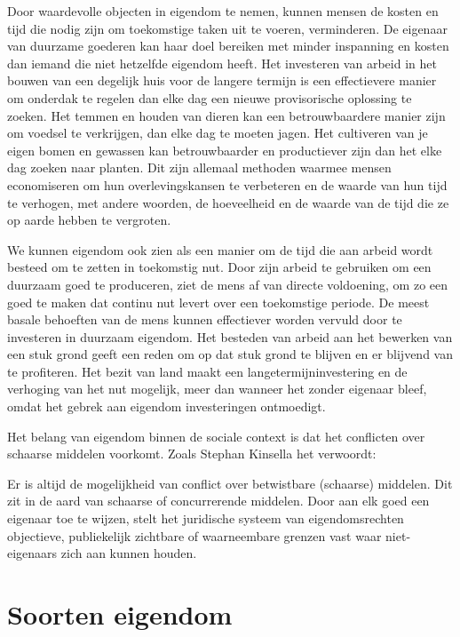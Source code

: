 Door waardevolle objecten in eigendom te nemen, kunnen mensen de kosten en tijd die nodig zijn om toekomstige taken uit te voeren, verminderen. De eigenaar van duurzame goederen kan haar doel bereiken met minder inspanning en kosten dan iemand die niet hetzelfde eigendom heeft. Het investeren van arbeid in het bouwen van een degelijk huis voor de langere termijn is een effectievere manier om onderdak te regelen dan elke dag een nieuwe provisorische oplossing te zoeken. Het temmen en houden van dieren kan een betrouwbaardere manier zijn om voedsel te verkrijgen, dan elke dag te moeten jagen. Het cultiveren van je eigen bomen en gewassen kan betrouwbaarder en productiever zijn dan het elke dag zoeken naar planten. Dit zijn allemaal methoden waarmee mensen economiseren om hun overlevingskansen te verbeteren en de waarde van hun tijd te verhogen, met andere woorden, de hoeveelheid en de waarde van de tijd die ze op aarde hebben te vergroten.

We kunnen eigendom ook zien als een manier om de tijd die aan arbeid wordt besteed om te zetten in toekomstig nut. Door zijn arbeid te gebruiken om een duurzaam goed te produceren, ziet de mens af van directe voldoening, om zo een goed te maken dat continu nut levert over een toekomstige periode. De meest basale behoeften van de mens kunnen effectiever worden vervuld door te investeren in duurzaam eigendom. Het besteden van arbeid aan het bewerken van een stuk grond geeft een reden om op dat stuk grond te blijven en er blijvend van te profiteren. Het bezit van land maakt een langetermijninvestering en de verhoging van het nut mogelijk, meer dan wanneer het zonder eigenaar bleef, omdat het gebrek aan eigendom investeringen ontmoedigt.

Het belang van eigendom binnen de sociale context is dat het conflicten over schaarse middelen voorkomt. Zoals Stephan Kinsella het verwoordt:

\begin{blockquotebox}
    Er is altijd de mogelijkheid van conflict over betwistbare (schaarse) middelen. Dit zit in de aard van schaarse of concurrerende middelen. Door aan elk goed een eigenaar toe te wijzen, stelt het juridische systeem van eigendomsrechten objectieve, publiekelijk zichtbare of waarneembare grenzen vast waar niet-eigenaars zich aan kunnen houden.\footnotemark
\end{blockquotebox}
\autocite{52}


\section{Soorten eigendom}


